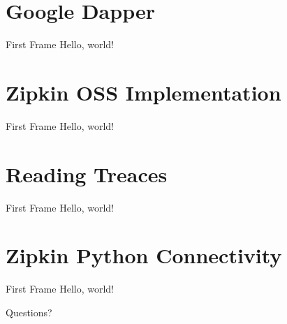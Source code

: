\documentclass[14pt]{beamer}
\begin{document}
  \section{Google Dapper}
  \begin{frame}{First Frame}
    Hello, world!
  \end{frame}
  \section{Zipkin OSS Implementation}
  \begin{frame}{First Frame}
    Hello, world!
  \end{frame}
  \section{Reading Treaces}
  \begin{frame}{First Frame}
    Hello, world!
  \end{frame}
  \section{Zipkin Python Connectivity}
  \begin{frame}{First Frame}
    Hello, world!
  \end{frame}
\begin{frame}[standout]
  Questions?
\end{frame}
\end{document}
